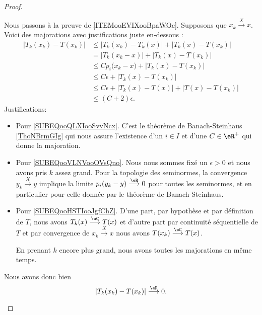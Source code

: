 \begin{proof}
\begin{subproof}
		Nous passons à la preuve de \ref{ITEMooEVIXooBpaWOc}. Supposons que \( x_k\stackrel{X}{\longrightarrow}x\). Voici des majorations avec justifications juste en-dessous :
		\begin{subequations}
			\begin{align}
				| T_k(x_k)-T(x_k) | & \leq | T_{k}(x_{k})-T_{k}(x) |+| T_{k}(x)-T(x_k) |                                   \\
				                    & =| T_k(x_k-x) |+| T_{k}(x)-T(x_{k}) |                                                \\
				                    & \leq C p_i\big( x_{k}-x \big) + | T_{k}(x)-T(x_k) |      \label{SUBEQooQLXIooSvvNcx} \\
				                    & \leq C \epsilon +    | T_{k}(x)-T(x_{k}) |          \label{SUBEQooVLNVooOVsQno}      \\
				                    & \leq C \epsilon    +| T_{k}(x)-T(x) |+| T(x)-T(x_{k}) |                              \\
				                    & \leq (C+2)\epsilon.        \label{SUBEQooHSTIooJgfChZ}
			\end{align}
		\end{subequations}
		Justifications:
		\begin{itemize}
			\item Pour \eqref{SUBEQooQLXIooSvvNcx}. C'est le théorème de Banach-Steinhaus \ref{ThoNBrmGIg} qui nous assure l'existence d'un \( i\in I\) et d'une \( C\in \eR^+\) qui donne la majoration.
			\item Pour \eqref{SUBEQooVLNVooOVsQno}. Nous nous sommes fixé un \( \epsilon>0\) et nous avons pris \( k\) assez grand. Pour la topologie des seminormes, la convergence \( y_k\stackrel{X}{\longrightarrow}y\) implique la limite \( p_i(y_k-y)\stackrel{\eR}{\longrightarrow}0\) pour toutes les seminormes, et en particulier pour celle donnée par le théorème de Banach-Steinhaus.
			\item Pour \eqref{SUBEQooHSTIooJgfChZ}. D'une part, par hypothèse et par définition de \( T\), nous avons \( T_{k}(x)\stackrel{\eC}{\longrightarrow}T(x)\) et d'autre part par continuité séquentielle de \( T\) et par convergence de \( x_{k}\stackrel{X}{\longrightarrow}x\) nous avons \( T(x_{k})\stackrel{\eC}{\longrightarrow} T(x)\).

			      En prenant \( k\) encore plus grand, nous avons toutes les majorations en même temps.
		\end{itemize}
		Nous avons donc bien
		\begin{equation}
			| T_{k}(x_{k})-T(x_{k}) |\stackrel{\eR}{\longrightarrow}0.
		\end{equation}


\end{subproof}
\end{proof}
